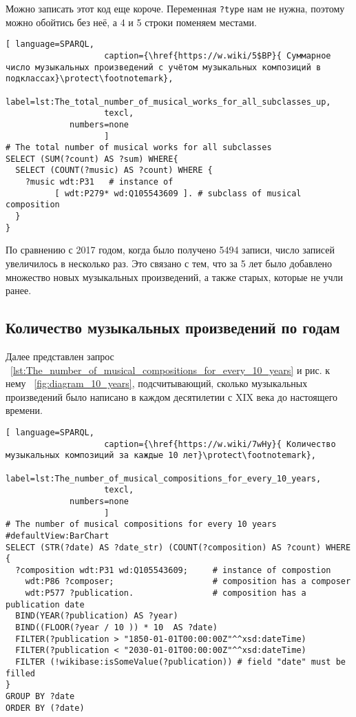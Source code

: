 Можно записать этот код еще короче. Переменная \lstinline|?type| нам не нужна, поэтому можно обойтись без неё, а 4 и 5 строки поменяем местами.

\begin{lstlisting}[ language=SPARQL,
                    caption={\href{https://w.wiki/5$BP}{ Суммарное число музыкальных произведений с учётом музыкальных композиций в подклассах}\protect\footnotemark},
                    label=lst:The_total_number_of_musical_works_for_all_subclasses_up,
                    texcl,
	         numbers=none
                    ]
# The total number of musical works for all subclasses 
SELECT (SUM(?count) AS ?sum) WHERE{
  SELECT (COUNT(?music) AS ?count) WHERE {
    ?music wdt:P31   # instance of
          [ wdt:P279* wd:Q105543609 ]. # subclass of musical composition
  }
}
\end{lstlisting}%

По сравнению с 2017 годом, когда было получено \num{5494} записи, число записей увеличилось в несколько раз. Это связано с тем, что за 5 лет было добавлено множество новых музыкальных произведений, а также старых, которые не учли ранее.


\subsection{Количество музыкальных произведений по годам}
Далее представлен запрос ~\ref{lst:The_number_of_musical_compositions_for_every_10_years} и рис. к нему ~\ref{fig:diagram_10_years}, подсчитывающий, сколько музыкальных произведений было написано в каждом десятилетии с XIX века до настоящего времени.

\begin{lstlisting}[ language=SPARQL,
                    caption={\href{https://w.wiki/7wHy}{ Количество музыкальных композиций за каждые 10 лет}\protect\footnotemark},
                    label=lst:The_number_of_musical_compositions_for_every_10_years,
                    texcl,
	         numbers=none
                    ]
# The number of musical compositions for every 10 years
#defaultView:BarChart
SELECT (STR(?date) AS ?date_str) (COUNT(?composition) AS ?count) WHERE {
  ?composition wdt:P31 wd:Q105543609;     # instance of compostion
    wdt:P86 ?composer;                    # composition has a composer
    wdt:P577 ?publication.                # composition has a publication date
  BIND(YEAR(?publication) AS ?year)
  BIND((FLOOR(?year / 10 )) * 10  AS ?date)
  FILTER(?publication > "1850-01-01T00:00:00Z"^^xsd:dateTime)
  FILTER(?publication < "2030-01-01T00:00:00Z"^^xsd:dateTime) 
  FILTER (!wikibase:isSomeValue(?publication)) # field "date" must be filled
}
GROUP BY ?date
ORDER BY (?date)
\end{lstlisting}%

